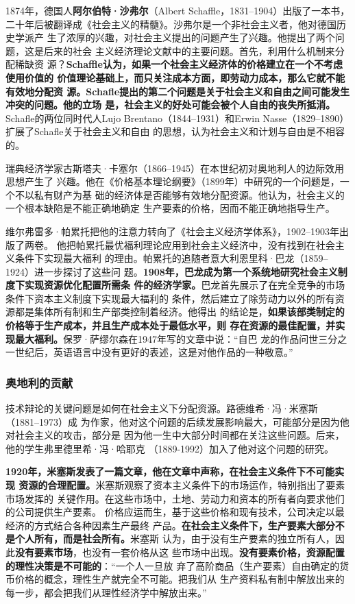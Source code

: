 1874年，德国人\textbf{阿尔伯特·沙弗尔}（Albert Schaffle，1831--1904）出版了一本书，
二十年后被翻译成《社会主义的精髓》。沙弗尔是一个非社会主义者，他对德国历史学派产
生了浓厚的兴趣，对社会主义提出的问题产生了兴趣。他提出了两个问题，这是后来的社会
主义经济理论文献中的主要问题。首先，利用什么机制来分配稀缺资
源？\textbf{Schaffle认为，如果一个社会主义经济体的价格建立在一个不考虑使用价值的
  价值理论基础上，而只关注成本方面，即劳动力成本，那么它就不能有效地分配资
  源。Schafle提出的第二个问题是关于社会主义和自由之间可能发生冲突的问题。他的立场
  是，社会主义的好处可能会被个人自由的丧失所抵消。}Schafle的两位同时代人Lujo
Brentano（1844--1931）和Erwin Nasse（1829--1890）扩展了Schafle关于社会主义和自由
的思想，认为社会主义和计划与自由是不相容的。

瑞典经济学家古斯塔夫·卡塞尔（1866--1945）在本世纪初对奥地利人的边际效用思想产生了
兴趣。他在《价格基本理论纲要》（1899年）中研究的一个问题是，一个不以私有财产为基
础的经济体是否能够有效地分配资源。他认为，社会主义的一个根本缺陷是不能正确地确定
生产要素的价格，因而不能正确地指导生产。

维尔弗雷多·帕累托把他的注意力转向了《社会主义经济学体系》，1902--1903年出版了两卷。
他把帕累托最优福利理论应用到社会主义经济中，没有找到在社会主义条件下实现最大福利
的理由。帕累托的追随者意大利恩里科·巴龙（1859--1924）进一步探讨了这些问
题。\textbf{1908年，巴龙成为第一个系统地研究社会主义制度下实现资源优化配置所需条
  件的经济学家。}巴龙首先展示了在完全竞争的市场条件下资本主义制度下实现最大福利的
条件，然后建立了除劳动力以外的所有资源都是集体所有制和生产部类控制着经济。他得出
的结论是，\textbf{如果该部类制定的价格等于生产成本，并且生产成本处于最低水平，则
  存在资源的最佳配置，并实现最大福利。}保罗·萨缪尔森在1947年写的文章中说：“自巴
龙的作品问世三分之一世纪后，英语语言中没有更好的表述，这是对他作品的一种敬意。”

\subsubsection{奥地利的贡献}

技术辩论的关键问题是如何在社会主义下分配资源。路德维希·冯·米塞斯（1881--1973）成
为作家，他对这个问题的后续发展影响最大，可能部分是因为他对社会主义的攻击，部分是
因为他一生中大部分时间都在关注这些问题。后来，他的学生弗里德里希·冯·哈耶克
（1889-1992）加入了他对这个问题的研究。

\textbf{1920年，米塞斯发表了一篇文章，他在文章中声称，在社会主义条件下不可能实现
  资源的合理配置。}米塞斯观察了资本主义条件下的市场运作，特别指出了要素市场发挥的
关键作用。在这些市场中，土地、劳动力和资本的所有者向要求他们的公司提供生产要素。
价格应运而生，基于这些价格和现有技术，公司决定以最经济的方式结合各种因素生产最终
产品。\textbf{在社会主义条件下，生产要素大部分不是个人所有，而是社会所有。}米塞斯
认为，由于没有生产要素的独立所有人，因此\textbf{没有要素市场}，也没有一套价格从这
些市场中出现。\textbf{没有要素价格，资源配置的理性决策是不可能的}：“一个人一旦放
弃了高阶商品（生产要素）自由确定的货币价格的概念，理性生产就完全不可能。把我们从
生产资料私有制中解放出来的每一步，都会把我们从理性经济学中解放出来。”

